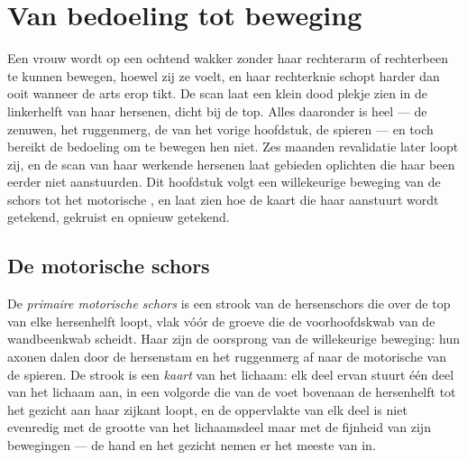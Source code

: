 \chapter{Van bedoeling tot beweging}\label{ch:g12:brain-and-movement}

Een vrouw wordt op een ochtend wakker zonder haar rechterarm of
rechterbeen te kunnen bewegen, hoewel zij ze voelt, en haar rechterknie
schopt harder dan ooit wanneer de arts erop tikt. De scan laat een klein
dood plekje zien in de linkerhelft van haar hersenen, dicht bij de top.
Alles daaronder is heel --- de zenuwen, het ruggenmerg, de  van
het vorige hoofdstuk, de spieren --- en toch bereikt de bedoeling om te
bewegen hen niet. Zes maanden revalidatie later loopt zij, en de scan van
haar werkende hersenen laat gebieden oplichten die haar been eerder niet
aanstuurden. Dit hoofdstuk volgt een willekeurige beweging van de schors
tot het motorische , en laat zien hoe de kaart die haar aanstuurt
wordt getekend, gekruist en opnieuw getekend.

\section{De motorische schors}

\begin{definition}\label{def:g12:brain-and-movement:cortex}
De \emph{primaire motorische schors} is een strook
van de hersenschors die over de top van elke hersenhelft loopt, vlak vóór
de groeve die de voorhoofdskwab van de wandbeenkwab scheidt. Haar 
zijn de oorsprong van de willekeurige beweging: hun axonen dalen door de
hersenstam en het ruggenmerg af naar de motorische  van de
spieren. De strook is een \emph{kaart} van het lichaam: elk deel ervan
stuurt één deel van het lichaam aan, in een volgorde die van de voet
bovenaan de hersenhelft tot het gezicht aan haar zijkant loopt, en de
oppervlakte van elk deel is niet evenredig met de grootte van het
lichaamsdeel maar met de fijnheid van zijn bewegingen --- de hand en het
gezicht nemen er het meeste van in.
\end{definition}

